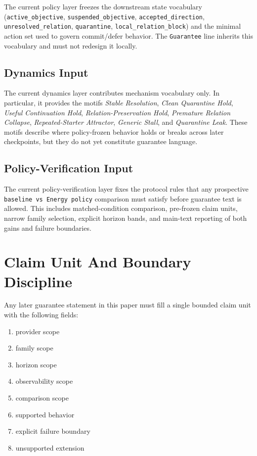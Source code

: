 \documentclass[11pt]{article}
\begin{document}
The current policy layer freezes the downstream state vocabulary
(\texttt{active\_objective}, \texttt{suspended\_objective},
\texttt{accepted\_direction}, \texttt{unresolved\_relation},
\texttt{quarantine}, \texttt{local\_relation\_block}) and the minimal action set
used to govern commit/defer behavior. The \texttt{Guarantee} line inherits this
vocabulary and must not redesign it locally.

\subsection{Dynamics Input}

The current dynamics layer contributes mechanism vocabulary only. In particular, it
provides the motifs \textit{Stable Resolution}, \textit{Clean Quarantine Hold},
\textit{Useful Continuation Hold}, \textit{Relation-Preservation Hold},
\textit{Premature Relation Collapse}, \textit{Repeated-Starter Attractor},
\textit{Generic Stall}, and \textit{Quarantine Leak}. These motifs describe where
policy-frozen behavior holds or breaks across later checkpoints, but they do not
yet constitute guarantee language.

\subsection{Policy-Verification Input}

The current policy-verification layer fixes the protocol rules that any prospective
\texttt{baseline vs Energy policy} comparison must satisfy before guarantee text is
allowed. This includes matched-condition comparison, pre-frozen claim units, narrow
family selection, explicit horizon bands, and main-text reporting of both gains and
failure boundaries.

\section{Claim Unit And Boundary Discipline}

Any later guarantee statement in this paper must fill a single bounded claim unit
with the following fields:

\begin{enumerate}
\item provider scope
\item family scope
\item horizon scope
\item observability scope
\item comparison scope
\item supported behavior
\item explicit failure boundary
\item unsupported extension
\end{enumerate}
\end{document}
